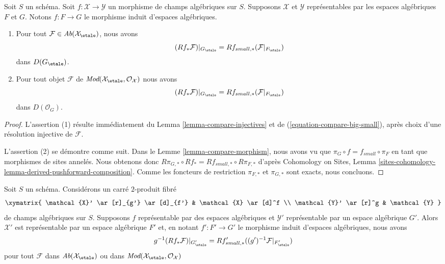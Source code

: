 \begin{lemma}
\label{lemma-compare-morphism-cohomology}
Soit $S$ un schéma. Soit $f : \mathcal{X} \to \mathcal{Y}$ un morphisme
de champs algébriques sur $S$. Supposons $\mathcal{X}$ et $\mathcal{Y}$
représentables par les espaces algébriques $F$ et $G$. Notons $f : F \to G$ le
morphisme induit d'espaces algébriques.
\begin{enumerate}
\item Pour tout $\mathcal{F} \in \textit{Ab}(\mathcal{X}_\etale)$,
nous avons
$$
(Rf_*\mathcal{F})|_{G_\etale} =
Rf_{small, *}(\mathcal{F}|_{F_\etale})
$$
dans $D(G_\etale)$.
\item Pour tout objet $\mathcal{F}$ de
$\textit{Mod}(\mathcal{X}_\etale, \mathcal{O}_\mathcal{X})$
nous avons
$$
(Rf_*\mathcal{F})|_{G_\etale} =
Rf_{small, *}(\mathcal{F}|_{F_\etale})
$$
dans $D(\mathcal{O}_G)$.
\end{enumerate}
\end{lemma}

\begin{proof}
L'assertion (1) résulte immédiatement du
Lemma \ref{lemma-compare-injectives}
et de (\ref{equation-compare-big-small}),
après choix d'une résolution injective de $\mathcal{F}$.

\medskip\noindent
L'assertion (2) se démontre comme suit. Dans le Lemme \ref{lemma-compare-morphism},
nous avons vu que $\pi_G \circ f = f_{small} \circ \pi_F$ en tant que morphismes
de sites annelés. Nous obtenons donc
$R\pi_{G, *} \circ Rf_* = Rf_{small, *} \circ R\pi_{F, *}$
d'après Cohomology on Sites, Lemma
\ref{sites-cohomology-lemma-derived-pushforward-composition}.
Comme les foncteurs de restriction $\pi_{F, *}$ et $\pi_{G, *}$
sont exacts, nous concluons.
\end{proof}

\begin{lemma}
\label{lemma-compare-representable-morphism-cohomology}
Soit $S$ un schéma. Considérons un carré $2$-produit fibré
$$
\xymatrix{
\mathcal{X}' \ar[r]_{g'} \ar[d]_{f'} & \mathcal{X} \ar[d]^f \\
\mathcal{Y}' \ar[r]^g & \mathcal{Y}
}
$$
de champs algébriques sur $S$. Supposons $f$ représentable par des espaces
algébriques et $\mathcal{Y}'$ représentable par un espace algébrique $G'$.
Alors $\mathcal{X}'$ est représentable par un espace algébrique $F'$ et,
en notant $f' : F' \to G'$ le morphisme induit d'espaces algébriques,
nous avons
$$
g^{-1}(Rf_*\mathcal{F})|_{G'_\etale} =
Rf'_{small, *}((g')^{-1}\mathcal{F}|_{F'_\etale})
$$
pour tout $\mathcal{F}$ dans $\textit{Ab}(\mathcal{X}_\etale)$
ou dans
$\textit{Mod}(\mathcal{X}_\etale, \mathcal{O}_\mathcal{X})$
\end{lemma}

